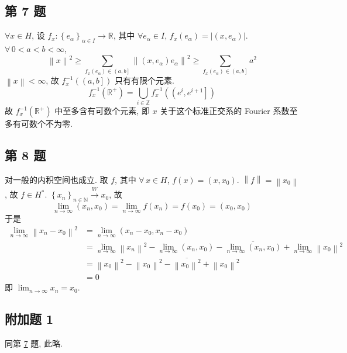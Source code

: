 \documentclass[\ROOT/main.tex]{subfiles}
\begin{document}
\subsection{第 7 题}\hypertarget{question:7}{}
$\forall x \in H$, 设 $f_x : \left\{ e_\alpha \right\}_{\alpha \in I} \to \mathbb{R}$, 其中 $\forall e_\alpha \in I$, $f_x \left( e_\alpha \right) = \left| \left( x, e_\alpha \right) \right|$.
$\forall \, 0 < a < b < \infty$,
\[
    \left\| x \right\|^2
    \geqslant
    \sum_{f_x \left( e_\alpha \right) \in \left( a, b \right]} \left\| \left( x, e_\alpha \right) e_\alpha \right\|^2
    \geqslant
    \sum_{f_x \left( e_\alpha \right) \in \left( a, b \right]} a^2
\]
$\left\| x \right\| < \infty$, 故 $f_x^{-1} \left( \left( a, b \right] \right)$ 只有有限个元素.
\[
    f_x^{-1} \left( \mathbb{R}^{+} \right)
    =
    \bigcup_{i \in \mathbb{Z}} f_x^{-1} \left( \left( e^i, e^{i + 1} \right] \right)
\]
故 $f_x^{-1} \left( \mathbb{R}^{+} \right)$ 中至多含有可数个元素, 即 $x$ 关于这个标准正交系的 Fourier 系数至多有可数个不为零.

\subsection{第 8 题}
对一般的内积空间也成立.
取 $f$, 其中 $\forall \, x \in H$, $f \left( x \right) = \left( x, x_0 \right)$.
$\left\| f \right\| = \left\| x_0 \right\|$, 故 $f \in H^*$.
$\left\{ x_n \right\}_{n \in \mathbb{N}} \xrightarrow{W} x_0$,
故
\[
    \lim_{n \to \infty} \left( x_n, x_0 \right)
    =
    \lim_{n \to \infty} f \left( x_n \right)
    =
    f \left( x_0 \right)
    =
    \left( x_0, x_0 \right)
\]
于是
\begin{align*}
    \lim_{n \to \infty} \left\| x_n - x_0 \right\|^2
    &=
    \lim_{n \to \infty} \left( x_n - x_0, x_n - x_0 \right) \\
    &=
    \lim_{n \to \infty} \left\| x_n \right\|^2 - \lim_{n \to \infty} \left( x_n, x_0 \right) - \overline{\lim_{n \to \infty} \left( x_n, x_0 \right)} + \lim_{n \to \infty} \left\| x_0 \right\|^2 \\
    &= \left\| x_0 \right\|^2 - \left\| x_0 \right\|^2 - \overline{\left\| x_0 \right\|^2} + \left\| x_0 \right\|^2 \\
    &=
    0
\end{align*}
即 $\displaystyle\lim_{n \to \infty} x_n = x_0$.

\subsection{附加题 1}
同第 \hyperlink{question:7}{7} 题, 此略.
\end{document}
